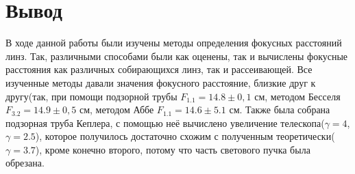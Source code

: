 \documentclass[a4paper,12pt]{extarticle}
\begin{document}
\section*{Вывод}
В ходе данной работы были изучены методы определения фокусных расстояний линз. Так, различными способами были как оценены, так и вычислены фокусные расстояния как различных собирающихся линз, так и рассеивающей. Все изученные методы давали значения фокусного расстояние, близкие друг к другу(так, при помощи подзорной трубы $F_{1.1} = 14.8 \pm 0,1$ см, методом Бесселя $F_{3.2} = 14.9 \pm 0,5$ см, методом Аббе $F_{1.1} = 14.6 \pm 5.1$ см. Также была собрана подзорная труба Кеплера, с помощью неё вычислено увеличение телескопа($\gamma = 4$, $\gamma = 2.5$), которое получилось достаточно схожим с полученным теоретически($\gamma = 3.7$), кроме конечно второго, потому что часть светового пучка была обрезана.
\end{document}
